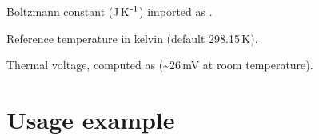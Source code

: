 \documentclass[letterpaper,10pt,english]{sphinxmanual}
\begin{document}

\begin{fulllineitems}
\label{\detokenize{thermal_constants:kb}}
\pysigstartsignatures
\pysigline
{}
\pysigstopsignatures
\sphinxAtStartPar
Boltzmann constant (J K⁻\(\sp{\text{1}}\)) \textendash{} imported as .

\end{fulllineitems}


\begin{fulllineitems}
\label{\detokenize{thermal_constants:T}}
\pysigstartsignatures
\pysigline
{}
\pysigstopsignatures
\sphinxAtStartPar
Reference temperature in kelvin (default 298.15 K).

\end{fulllineitems}


\begin{fulllineitems}
\label{\detokenize{thermal_constants:Vt}}
\pysigstartsignatures
\pysigline
{}
\pysigstopsignatures
\sphinxAtStartPar
Thermal voltage, computed as  (\textasciitilde{}26 mV at room temperature).

\end{fulllineitems}



\section{Usage example}
\label{\detokenize{thermal_constants:usage-example}}
\begin{sphinxVerbatim}[commandchars=\\\{\}]
 
\end{sphinxVerbatim}
\end{document}
